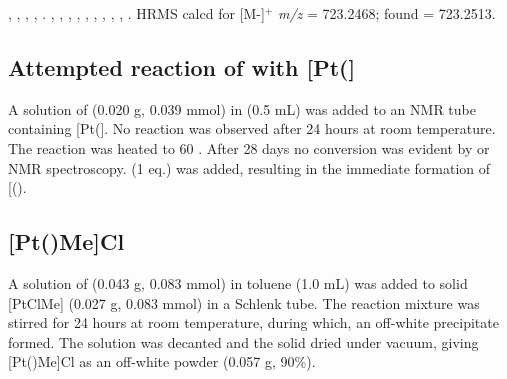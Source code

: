 ,
,
,
,
.
,
,
,
,
,
,
,
,
,
.
HRMS calcd for  [M-]$^+$ \emph{m/z} = 723.2468; found = 723.2513.

\subsection*{Attempted reaction of \tButhixantphos{} with [Pt(]}

A solution of \tButhixantphos{} (0.020 g, 0.039 mmol) in  (0.5 mL) was added to an NMR tube containing [Pt(].  No reaction was observed after 24 hours at room temperature.  The reaction was heated to 60 \degC{}.  After 28 days no conversion was evident by \phosphorus{} or \proton{} NMR spectroscopy.   (1 eq.) was added, resulting in the immediate formation of [(\tButhixantphos)\ce{H]+}.

\subsection*{[Pt(\tButhixantphosk)Me]Cl}


A solution of \tButhixantphos{} (0.043 g, 0.083 mmol) in toluene (1.0 mL) was added to solid [PtClMe] (0.027 g, 0.083 mmol) in a Schlenk tube.  The reaction mixture was stirred for 24 hours at room temperature, during which, an off-white precipitate formed.  The solution was decanted and the   solid dried under vacuum, giving [Pt(\tButhixantphos)Me]Cl as an off-white powder (0.057 g, 90\%).

